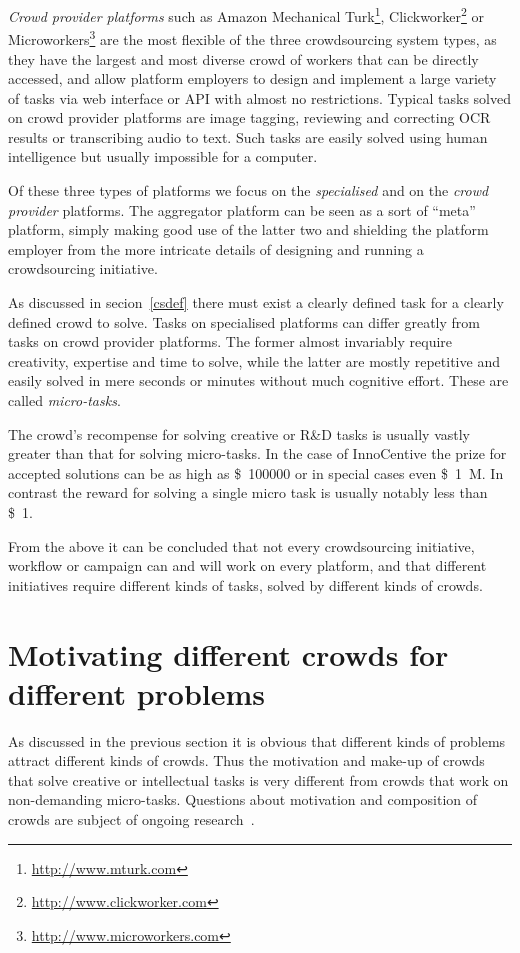 \documentclass{sig-alternate}
\begin{document}
\emph{Crowd provider platforms} such as Amazon Mechanical
Turk\footnote{\url{http://www.mturk.com}},
Clickworker\footnote{\url{http://www.clickworker.com}} or
Microworkers\footnote{\url{http://www.microworkers.com}} are the most flexible
of the three crowdsourcing system types, as they have the largest and most diverse
crowd of workers that can be directly accessed, and allow platform employers to
design and implement a large variety of tasks via web interface or API with
almost no restrictions. Typical tasks solved on crowd provider platforms are
image tagging, reviewing and correcting OCR results or transcribing audio to
text. Such tasks are easily solved using human intelligence but usually
impossible for a computer.

Of these three types of platforms we focus on the \emph{specialised} and on the
\emph{crowd provider} platforms. The aggregator platform can be seen as a
sort of ``meta'' platform, simply making good use of the latter two and
shielding the platform employer from the more intricate details of designing
and running a crowdsourcing initiative.

As discussed in secion~\ref{csdef} there must exist a clearly defined task for
a clearly defined crowd to solve. Tasks on specialised platforms can differ
greatly from tasks on crowd provider platforms. The former almost invariably
require creativity, expertise and time to solve, while the latter are mostly
repetitive and easily solved in mere seconds or minutes without much cognitive
effort.  These are called \emph{micro-tasks}.

The crowd's recompense for solving creative or R\&D tasks is usually vastly
greater than that for solving micro-tasks. In the case of InnoCentive the prize
for accepted solutions can be as high as \SI{100000}[\$]{} or in special cases
even \SI{1}[\$]{M}. In contrast the reward for solving a single micro
task is usually notably less than \SI{1}[\$]{}.

From the above it can be concluded that not every crowdsourcing initiative,
workflow or campaign can and will work on every platform, and that different
initiatives require different kinds of tasks, solved by different kinds of
crowds. 

\section{Motivating different crowds for different problems}

As discussed in the previous section it is obvious that different kinds of
problems attract different kinds of crowds. Thus the motivation and make-up of
crowds that solve creative or intellectual tasks is very different from crowds
that work on non-demanding micro-tasks. Questions about motivation and
composition of crowds are subject of ongoing
research~\cite{antikainen2010motivating, brabham2008moving, brabham2010moving,
	chandler2013breaking, horton2010labor, kaufmann2011more,
	mason2010financial}.
\end{document}
